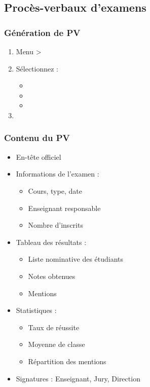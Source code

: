 \subsection{Procès-verbaux d'examens}

\subsubsection{Génération de PV}

\begin{enumerate}[leftmargin=*]
    \item Menu  > 
    \item Sélectionnez :
    \begin{itemize}
        \item {}
        \item {}
        \item {}
    \end{itemize}
    \item {}
\end{enumerate}

\subsubsection{Contenu du PV}

\begin{itemize}[leftmargin=*]
    \item En-tête officiel
    \item Informations de l'examen :
    \begin{itemize}
        \item Cours, type, date
        \item Enseignant responsable
        \item Nombre d'inscrits
    \end{itemize}
    \item Tableau des résultats :
    \begin{itemize}
        \item Liste nominative des étudiants
        \item Notes obtenues
        \item Mentions
    \end{itemize}
    \item Statistiques :
    \begin{itemize}
        \item Taux de réussite
        \item Moyenne de classe
        \item Répartition des mentions
    \end{itemize}
    \item Signatures : Enseignant, Jury, Direction
\end{itemize}

